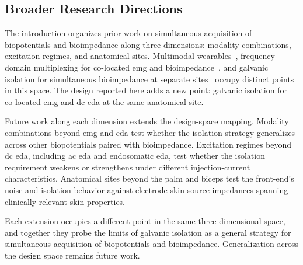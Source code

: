 \subsection{Broader Research Directions}
\label{sec:disc-future-generalization}

The introduction organizes prior work on simultaneous acquisition of biopotentials and bioimpedance along three dimensions: modality combinations, excitation regimes, and anatomical sites. Multimodal wearables~\cite{affanni_dual_2019, affanni_wireless_2020, mcnaboe_design_2022}, frequency-domain multiplexing for co-located \gls{emg} and bioimpedance~\cite{ngo_wearable_2022}, and galvanic isolation for simultaneous bioimpedance at separate sites~\cite{kusche_galvanically_2017} occupy distinct points in this space. The design reported here adds a new point: galvanic isolation for co-located \gls{emg} and \gls{dc} \gls{eda} at the same anatomical site.

Future work along each dimension extends the design-space mapping. Modality combinations beyond \gls{emg} and \gls{eda} test whether the isolation strategy generalizes across other biopotentials paired with bioimpedance. Excitation regimes beyond \gls{dc} \gls{eda}, including \gls{ac} \gls{eda} and endosomatic \gls{eda}, test whether the isolation requirement weakens or strengthens under different injection-current characteristics. Anatomical sites beyond the palm and biceps test the front-end's noise and isolation behavior against electrode-skin source impedances spanning clinically relevant skin properties.

Each extension occupies a different point in the same three-dimensional space, and together they probe the limits of galvanic isolation as a general strategy for simultaneous acquisition of biopotentials and bioimpedance. Generalization across the design space remains future work.

